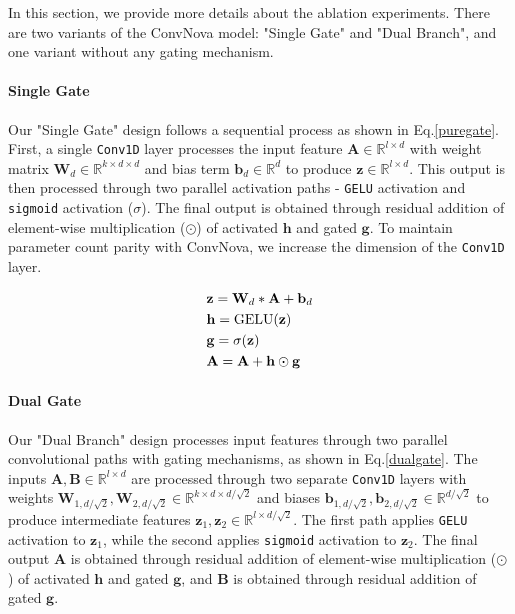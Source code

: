 In this section, we provide more details about the ablation experiments. There are two variants of the ConvNova model: "Single Gate" and "Dual Branch", and one variant without any gating mechanism.


\paragraph{Single Gate}

Our "Single Gate" design follows a sequential process as shown in Eq.\ref{puregate}. First, a single \texttt{Conv1D} layer processes the input feature $\mathbf{A} \in \mathbb{R}^{l \times d}$ with weight matrix $\mathbf{W}_d \in \mathbb{R}^{k \times d \times d}$ and bias term $\mathbf{b}_d \in \mathbb{R}^d$ to produce $\mathbf{z} \in \mathbb{R}^{l \times d}$. This output is then processed through two parallel activation paths - \texttt{GELU} activation and \texttt{sigmoid} activation ($\sigma$). The final output is obtained through residual addition of element-wise multiplication ($\odot$) of activated $\mathbf{h}$ and gated $\mathbf{g}$. To maintain parameter count parity with ConvNova, we increase the dimension of the \texttt{Conv1D} layer.


\begin{equation}\label{puregate}
\textcolor{black}{
\centering
\begin{aligned}
    &\mathbf{z} = \mathbf{W}_d * \mathbf{A} + \mathbf{b}_d \\
    &\mathbf{h} = \operatorname{GELU}(\mathbf{z}) \\
    &\mathbf{g} = \sigma(\mathbf{z}) \\
    &\mathbf{A} = \mathbf{A} + \mathbf{h} \odot \mathbf{g}
\end{aligned}
}
\end{equation}

\paragraph{Dual Gate}

Our "Dual Branch" design processes input features through two parallel convolutional paths with gating mechanisms, as shown in Eq.\ref{dualgate}. The inputs $\mathbf{A}, \mathbf{B} \in \mathbb{R}^{l \times d}$ are processed through two separate \texttt{Conv1D} layers with weights $\mathbf{W}_{1, d/\sqrt{2}}, \mathbf{W}_{2, d/\sqrt{2}} \in \mathbb{R}^{k \times d \times d/\sqrt{2}}$ and biases $\mathbf{b}_{1, d/\sqrt{2}}, \mathbf{b}_{2, d/\sqrt{2}} \in \mathbb{R}^{d/\sqrt{2}}$ to produce intermediate features $\mathbf{z}_1, \mathbf{z}_2 \in \mathbb{R}^{l \times d/\sqrt{2}}$. The first path applies \texttt{GELU} activation to $\mathbf{z}_1$, while the second applies \texttt{sigmoid} activation to $\mathbf{z}_2$. The final output $\mathbf{A}$ is obtained through residual addition of element-wise multiplication ($\odot$) of activated $\mathbf{h}$ and gated $\mathbf{g}$, and $\mathbf{B}$ is obtained through residual addition of gated $\mathbf{g}$.


